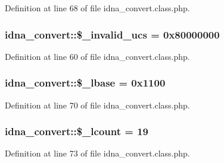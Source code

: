 Definition at line 68 of file idna\+\_\+convert.\+class.\+php.

\hypertarget{classidna__convert_a741bab9cbe7aec53249d714143bbe53b}{}
\subsubsection[{\$\+\_\+invalid\+\_\+ucs}]{\setlength{\rightskip}{0pt plus 5cm}idna\+\_\+convert\+::\$\+\_\+invalid\+\_\+ucs = 0x80000000\hspace{0.3cm}{\ttfamily [protected]}}\label{classidna__convert_a741bab9cbe7aec53249d714143bbe53b}


Definition at line 60 of file idna\+\_\+convert.\+class.\+php.

\hypertarget{classidna__convert_a50c50cda465aefe78b8ed69ae6cd6247}{}
\subsubsection[{\$\+\_\+lbase}]{\setlength{\rightskip}{0pt plus 5cm}idna\+\_\+convert\+::\$\+\_\+lbase = 0x1100\hspace{0.3cm}{\ttfamily [protected]}}\label{classidna__convert_a50c50cda465aefe78b8ed69ae6cd6247}


Definition at line 70 of file idna\+\_\+convert.\+class.\+php.

\hypertarget{classidna__convert_ae191087842e21e5f56a0df02f922abbe}{}
\subsubsection[{\$\+\_\+lcount}]{\setlength{\rightskip}{0pt plus 5cm}idna\+\_\+convert\+::\$\+\_\+lcount = 19\hspace{0.3cm}{\ttfamily [protected]}}\label{classidna__convert_ae191087842e21e5f56a0df02f922abbe}


Definition at line 73 of file idna\+\_\+convert.\+class.\+php.

\hypertarget{classidna__convert_aea20377d4d2659186a1901d6a66f5d58}{}

